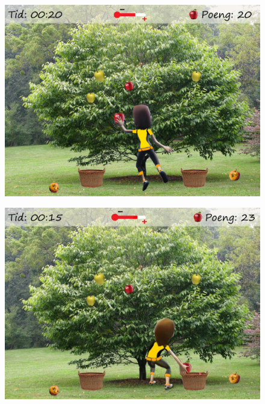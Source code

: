 \begin{figure} [H]
\centering
\includegraphics[scale=0.1]{gameappletree.jpg}
\label{fig:appleStretchNorsk}
\end{figure}

\begin{figure} [H]
\centering
\includegraphics[scale=0.45]{squateple.jpg}
\label{fig:appleSquatNorsk}
\end{figure}

